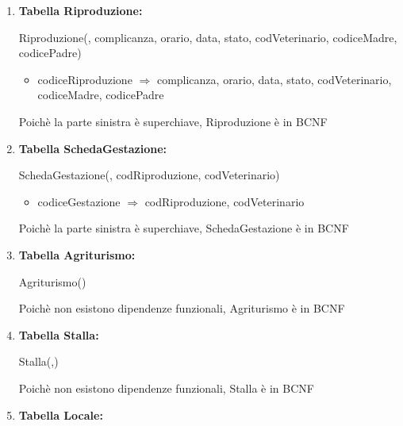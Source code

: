 \documentclass[12pt,a4paper]{article}
\begin{document}
\begin{enumerate}
\item[] \textbf{Tabella Riproduzione:}

Riproduzione(\underline{}, complicanza, orario, data, stato, codVeterinario, codiceMadre, codicePadre)
\begin{itemize}
\vspace{-5pt}
\item codiceRiproduzione $\Rightarrow$ complicanza, orario, data, stato, codVeterinario, codiceMadre, codicePadre
\vspace{-5pt}
\end{itemize}
Poichè la parte sinistra è superchiave, Riproduzione è in BCNF
\vspace{10pt}



\item[] \textbf{Tabella SchedaGestazione:}

SchedaGestazione(\underline{},  codRiproduzione,  codVeterinario)
\begin{itemize}
\vspace{-5pt}
\item codiceGestazione $\Rightarrow$ codRiproduzione, codVeterinario
\vspace{-5pt}
\end{itemize}
Poichè la parte sinistra è superchiave, SchedaGestazione è in BCNF
\vspace{10pt}



\item[] \textbf{Tabella Agriturismo:}

Agriturismo(\underline{})

Poichè non esistono dipendenze funzionali, Agriturismo è in BCNF
\vspace{10pt}



\item[] \textbf{Tabella Stalla:}

Stalla(\underline{},\underline{})

Poichè non esistono dipendenze funzionali, Stalla è in BCNF
\vspace{10pt}



\item[] \textbf{Tabella Locale:}


\end{enumerate}
\end{document}
